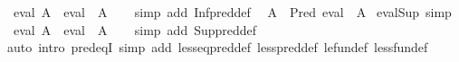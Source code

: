 \begin{isabellebody}
\ \ {\isachardoublequoteopen}eval\ {\isacharparenleft}{\kern0pt}{\isasymSqinter}A{\isacharparenright}{\kern0pt}\ {\isacharequal}{\kern0pt}\ {\isasymSqinter}{\isacharparenleft}{\kern0pt}eval\ {\isacharbackquote}{\kern0pt}\ A{\isacharparenright}{\kern0pt}{\isachardoublequoteclose}\isanewline
%
\isadelimproof
\ \ %
\endisadelimproof
%
\isatagproof
{}\isamarkupfalse%
\ {\isacharparenleft}{\kern0pt}simp\ add{\isacharcolon}{\kern0pt}\ Inf{\isacharunderscore}{\kern0pt}pred{\isacharunderscore}{\kern0pt}def{\isacharparenright}{\kern0pt}%
\endisatagproof
{\isafoldproof}%
%
\isadelimproof
\isanewline
%
\endisadelimproof
\isanewline
{}\isamarkupfalse%
\isanewline
\ \ {\isachardoublequoteopen}{\isasymSqunion}A\ {\isacharequal}{\kern0pt}\ Pred\ {\isacharparenleft}{\kern0pt}{\isasymSqunion}{\isacharparenleft}{\kern0pt}eval\ {\isacharbackquote}{\kern0pt}\ A{\isacharparenright}{\kern0pt}{\isacharparenright}{\kern0pt}{\isachardoublequoteclose}\isanewline
\isanewline
{}\isamarkupfalse%
\ eval{\isacharunderscore}{\kern0pt}Sup\ {\isacharbrackleft}{\kern0pt}simp{\isacharbrackright}{\kern0pt}{\isacharcolon}{\kern0pt}\isanewline
\ \ {\isachardoublequoteopen}eval\ {\isacharparenleft}{\kern0pt}{\isasymSqunion}A{\isacharparenright}{\kern0pt}\ {\isacharequal}{\kern0pt}\ {\isasymSqunion}{\isacharparenleft}{\kern0pt}eval\ {\isacharbackquote}{\kern0pt}\ A{\isacharparenright}{\kern0pt}{\isachardoublequoteclose}\isanewline
%
\isadelimproof
\ \ %
\endisadelimproof
%
\isatagproof
{}\isamarkupfalse%
\ {\isacharparenleft}{\kern0pt}simp\ add{\isacharcolon}{\kern0pt}\ Sup{\isacharunderscore}{\kern0pt}pred{\isacharunderscore}{\kern0pt}def{\isacharparenright}{\kern0pt}%
\endisatagproof
{\isafoldproof}%
%
\isadelimproof
\isanewline
%
\endisadelimproof
\isanewline
{}\isamarkupfalse%
%
\isadelimproof
\ %
\endisadelimproof
%
\isatagproof
{}\isamarkupfalse%
\isanewline
{}\isamarkupfalse%
\ {\isacharparenleft}{\kern0pt}auto\ intro{\isacharbang}{\kern0pt}{\isacharcolon}{\kern0pt}\ pred{\isacharunderscore}{\kern0pt}eqI\ simp\ add{\isacharcolon}{\kern0pt}\ less{\isacharunderscore}{\kern0pt}eq{\isacharunderscore}{\kern0pt}pred{\isacharunderscore}{\kern0pt}def\ less{\isacharunderscore}{\kern0pt}pred{\isacharunderscore}{\kern0pt}def\ le{\isacharunderscore}{\kern0pt}fun{\isacharunderscore}{\kern0pt}def\ less{\isacharunderscore}{\kern0pt}fun{\isacharunderscore}{\kern0pt}def{\isacharparenright}{\kern0pt}%
\endisatagproof
{\isafoldproof}%
%
\isadelimproof
%
\endisadelimproof
\isanewline
\isanewline
{}\isamarkupfalse%

\end{isabellebody}
